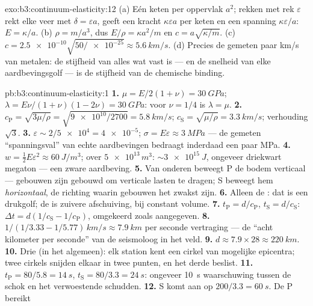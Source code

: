 \begin{solution}{exo:b3:continuum-elasticity:12}
(a) Eén keten per oppervlak $a^2$; rekken met rek $\varepsilon$ rekt elke
veer met $\delta = \varepsilon a$, geeft een kracht $\kappa
\varepsilon a$
per keten en een spanning $\kappa\varepsilon/a$: $E =
\kappa/a$. (b)
$\rho = m/a^3$, dus $E/\rho = \kappa a^2/m$ en $c =
a\sqrt{\kappa/m}$.
(c) $c = \num{2.5e-10}\sqrt{50/\num{e-25}} \approx
\qty{5.6}{km/s}$. (d)
Precies de gemeten paar km/s van metalen: de stijfheid van alles wat vast
is --- en de snelheid van elke aardbevingsgolf --- is de stijfheid van de
chemische binding.
\end{solution}

\begin{solution}{pb:b3:continuum-elasticity:1}
\textbf{1.} $\mu = E/2(1+\nu) = \qty{30}{GPa}$; $\lambda =
E\nu/(1+\nu)(1-2\nu) = \qty{30}{GPa}$: voor $\nu = 1/4$ is $\lambda =
\mu$.
\textbf{2.} $c_{\text{P}} = \sqrt{3\mu/\rho} = \sqrt{\num{9e10}/2700}
= \qty{5.8}{km/s}$; $c_{\text{S}} = \sqrt{\mu/\rho} =
\qty{3.3}{km/s}$; verhouding $\sqrt3$.
\textbf{3.} $\varepsilon \sim 2/\num{5e4} = \num{4e-5}$; $\sigma =
E\varepsilon \approx \qty{3}{MPa}$ --- de gemeten ``spanningsval'' van
echte aardbevingen bedraagt inderdaad een paar MPa.
\textbf{4.} $w = \tfrac12 E\varepsilon^2 \approx \qty{60}{J/m^3}$;
over $\num{5e13}{}\,\unit{m^3}$: $\sim\qty{3e15}{J}$, ongeveer
driekwart megaton --- een zware aardbeving.
\textbf{5.} Van onderen beweegt P de bodem verticaal --- gebouwen zijn
gebouwd om verticale lasten te dragen; S beweegt hem \emph{horizontaal},
de richting waarin gebouwen het zwakst zijn.
\textbf{6.} Alleen de : dat is een drukgolf; de  is zuivere
afschuiving, bij constant volume.
\textbf{7.} $t_{\text{P}} = d/c_{\text{P}}$, $t_{\text{S}} =
d/c_{\text{S}}$: $\Delta t = d(1/c_{\text{S}} - 1/c_{\text{P}})$,
omgekeerd zoals aangegeven.
\textbf{8.} $1/(1/3.33 - 1/5.77)\,\unit{km/s} \approx
\qty{7.9}{km}$ per seconde vertraging --- de ``acht kilometer per
seconde'' van de seismoloog in het veld.
\textbf{9.} $d \approx 7.9 \times 28 \approx \qty{220}{km}$.
\textbf{10.} Drie (in het algemeen): elk station kent een cirkel van
mogelijke epicentra; twee cirkels snijden elkaar in twee punten, en het
derde beslist.
\textbf{11.} $t_{\text{P}} = 80/5.8 = \qty{14}{s}$, $t_{\text{S}} =
80/3.3 = \qty{24}{s}$: ongeveer \qty{10}{s} waarschuwing tussen de schok
en het verwoestende schudden.
\textbf{12.} S komt aan op $200/3.3 = \qty{60}{s}$. De P bereikt

\end{solution}
